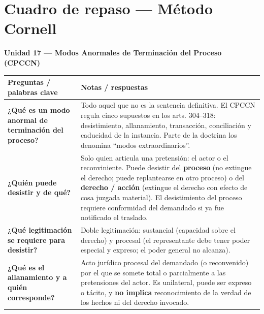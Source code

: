 \documentclass[12pt,oneside]{book}
\begin{document}
\chapter*{Cuadro de repaso --- Método Cornell}

\vspace{0.5em}

\noindent\textbf{Unidad 17 --- Modos Anormales de Terminación del Proceso (CPCCN)}

\vspace{0.8em}

\begin{table}[H]
\centering
\begin{tabularx}{\textwidth}{
    >{\raggedright\arraybackslash}p{}
    >{\raggedright\arraybackslash}X
}
\toprule
\textbf{Preguntas / palabras clave} & \textbf{Notas / respuestas} \\
\midrule

\textbf{¿Qué es un modo anormal de terminación del proceso?} &
Todo aquel que no es la sentencia definitiva. El CPCCN regula cinco supuestos en los arts. 304--318: desistimiento, allanamiento, transacción, conciliación y caducidad de la instancia. Parte de la doctrina los denomina ``modos extraordinarios''. \\[0.6em]

\textbf{¿Quién puede desistir y de qué?} &
Solo quien articula una pretensión: el actor o el reconviniente. Puede desistir del \textbf{proceso} (no extingue el derecho; puede replantearse en otro proceso) o del \textbf{derecho / acción} (extingue el derecho con efecto de cosa juzgada material). El desistimiento del proceso requiere conformidad del demandado si ya fue notificado el traslado. \\[0.6em]

\textbf{¿Qué legitimación se requiere para desistir?} &
Doble legitimación: sustancial (capacidad sobre el derecho) y procesal (el representante debe tener poder especial y expreso; el poder general no alcanza). \\[0.6em]

\textbf{¿Qué es el allanamiento y a quién corresponde?} &
Acto jurídico procesal del demandado (o reconvenido) por el que se somete total o parcialmente a las pretensiones del actor. Es unilateral, puede ser expreso o tácito, y \textbf{no implica} reconocimiento de la verdad de los hechos ni del derecho invocado. \\[0.6em]


\end{tabularx}
\end{table}
\end{document}
